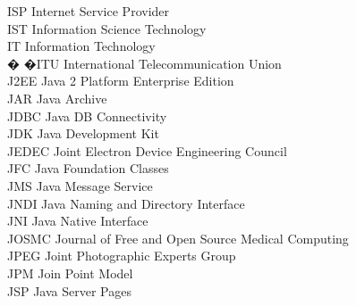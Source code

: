 \begin{tabbing}
    \>ISP \>\>Internet Service Provider\\

    \>IST \>\>Information Science Technology\\

    \>IT \>\>Information Technology\\


 � �\>ITU \>\>International Telecommunication Union\\

    \>J2EE \>\>Java 2 Platform Enterprise Edition\\

    \>JAR \>\>Java Archive\\

    \>JDBC \>\>Java DB Connectivity\\

    \>JDK \>\>Java Development Kit\\

    \>JEDEC \>\>Joint Electron Device Engineering Council\\

    \>JFC \>\>Java Foundation Classes\\

    \>JMS \>\>Java Message Service\\

    \>JNDI \>\>Java Naming and Directory Interface\\

    \>JNI \>\>Java Native Interface\\

    \>JOSMC \>\>Journal of Free and Open Source Medical Computing\\


    \>JPEG \>\>Joint Photographic Experts Group\\

    \>JPM \>\>Join Point Model\\


    \>JSP \>\>Java Server Pages\\



\end{tabbing}
